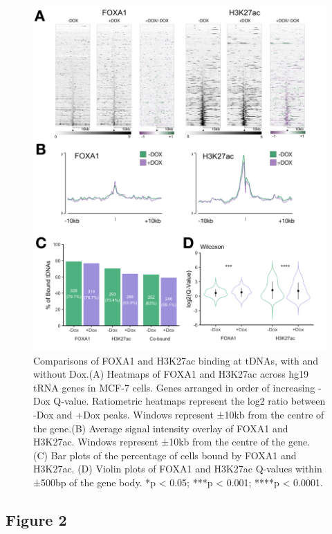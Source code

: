 \documentclass[
  11pt,
]{article}
\begin{document}
\begin{figure}[p]

{\centering \includegraphics[width=1\linewidth]{../images/results-01} 

}

\caption{Comparisons of FOXA1 and H3K27ac binding at tDNAs, with and without Dox.(A) Heatmaps of FOXA1 and H3K27ac across hg19 tRNA genes in MCF-7 cells. Genes arranged in order of increasing -Dox Q-value. Ratiometric heatmaps represent the log2 ratio between -Dox and +Dox peaks. Windows represent ±10kb from the centre of the gene.(B) Average signal intensity overlay of FOXA1 and H3K27ac. Windows represent ±10kb from the centre of the gene. (C) Bar plots of the percentage of cells bound by FOXA1 and H3K27ac. (D) Violin plots of FOXA1 and H3K27ac Q-values within ±500bp of the gene body. *p < 0.05; ***p < 0.001; ****p < 0.0001.}\label{fig:results-1}
\end{figure}

\hypertarget{figure-2}{%
\subsection{Figure 2}\label{figure-2}}
\end{document}
